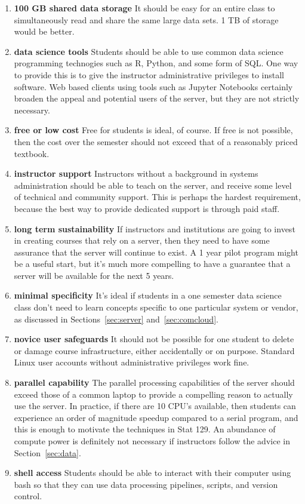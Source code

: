 \documentclass[12pt]{article}
\begin{document}
\begin{enumerate}
\item \textbf{100 GB shared data storage} It should be easy for an entire class to simultaneously read and share the same large data sets.
    1 TB of storage would be better.
\item \textbf{data science tools} Students should be able to use common data science programming technogies such as R, Python, and some form of SQL.
    One way to provide this is to give the instructor administrative privileges to install software.
    Web based clients using tools such as Jupyter Notebooks certainly broaden the appeal and potential users of the server, but they are not strictly necessary.
\item \textbf{free or low cost} Free for students is ideal, of course.
    If free is not possible, then the cost over the semester should not exceed that of a reasonably priced textbook.
\item \textbf{instructor support}
    Instructors without a background in systems administration should be able to teach on the server, and receive some level of technical and community support.
    This is perhaps the hardest requirement, because the best way to provide dedicated support is through paid staff.
\item \textbf{long term sustainability} 
    If instructors and institutions are going to invest in creating courses that rely on a server, then they need to have some assurance that the server will continue to exist.
    A 1 year pilot program might be a useful start, but it's much more compelling to have a guarantee that a server will be available for the next 5 years.
\item \textbf{minimal specificity}
    It's ideal if students in a one semester data science class don't need to learn concepts specific to one particular system or vendor, as discussed in Sections~\ref{sec:server} and~\ref{sec:comcloud}.
\item \textbf{novice user safeguards} It should not be possible for one student to delete or damage course infrastructure, either accidentally or on purpose.
    Standard Linux user accounts without administrative privileges work fine.
\item \textbf{parallel capability}
    The parallel processing capabilities of the server should exceed those of a common laptop to provide a compelling reason to actually use the server.
    In practice, if there are 10 CPU's available, then students can experience an order of magnitude speedup compared to a serial program, and this is enough to motivate the techniques in Stat 129.
    An abundance of compute power is definitely not necessary if instructors follow the advice in Section~\ref{sec:data}.
\item \textbf{shell access} Students should be able to interact with their computer using bash so that they can use data processing pipelines, scripts, and version control.
\end{enumerate}
\end{document}

